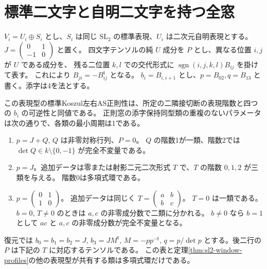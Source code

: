 \section{標準二文字と自明二文字を持つ全窓}
\label{sec:one-standard-sl2}
$V_i=U_i\oplus S_i$ とし、$S_i$ は同じ $\mathrm{SL}_2$ の標準表現、$U_i$ は二次元自明表現とする。
$J=\left(\begin{smallmatrix}0&1\\-1&0\end{smallmatrix}\right)$ と置く。
四文字テンソルの純 $U$ 成分を $P$ とし、異なる位置 $i,j$ が $U$ である成分を、
残る二位置 $k,l$ での交代形式に $\operatorname{sgn}(i,j,k,l) B_{ij}$ を掛けて表す。
これにより $B_{ji}=-B_{ij}^{\mathsf t}$ となる。
$b_i=B_{i,i+1}$ とし、$p=B_{02},q=B_{13}$ と書く。添字は4を法とする。

\begin{theorem}\label{thm:one-standard-sl2-classification}
この表現型の標準Koszul左右AS正則性は、所定の二隣接切断の表現階数と四つの $b_i$ の可逆性と同値である。
正則窓の添字保持同型類の重複のないパラメータは次の通りで、各類の最小周期は1である。
\begin{enumerate}
\item $p=J+Q$, $Q$ は非零対称行列、$P=0$。
$Q$ の階数1が一類、階数2では $\det Q\in k\setminus\{0,-1\}$ が完全不変量である。
\item $p=J$。追加データは零または射影二元二次形式 $T$ で、$T$ の階数 $0,1,2$ が三類を与える。
階数0は多項式環である。
\item $p=\left(\begin{smallmatrix}0&1\\1&0\end{smallmatrix}\right)$。
追加データは同じく $T=\left(\begin{smallmatrix}a&b\\b&c\end{smallmatrix}\right)$。
$T=0$ は一類である。$b=0$, $T\ne0$ のときは $a,c$ の非零成分数で二類に分かれる。
$b\ne0$ なら $b=1$ として $ac$ と $a,c$ の非零成分数が完全不変量となる。
\end{enumerate}
復元では $b_0=b_1=b_2=J$, $b_3=JM^{\mathsf t}$, $M=-pp^{-\mathsf t}$,
$q=p/\det p$ とする。後二行の $P$ は下記の $T$ に対応するテンソルである。
この表と定理\ref{thm:sl2-window-profiles}の他の表現型が共有する類は多項式環だけである。
\end{theorem}

